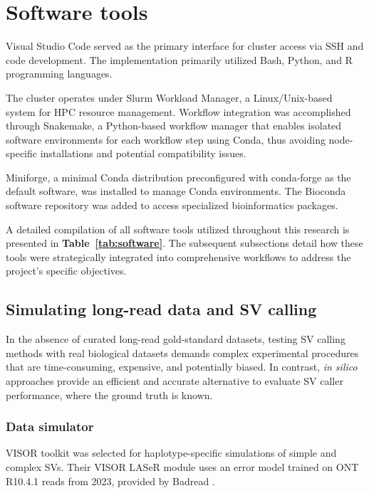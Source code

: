 \section{Software tools}

Visual Studio Code served as the primary interface for cluster access via SSH 
and code development. The implementation primarily utilized Bash, Python, and R 
programming languages.

The cluster operates under Slurm Workload Manager, a Linux/Unix-based system for 
HPC resource management. Workflow integration was accomplished through 
Snakemake, a Python-based workflow manager that enables isolated software 
environments for each workflow step using Conda, thus avoiding node-specific 
installations and potential compatibility issues.

Miniforge, a minimal Conda distribution preconfigured with conda-forge as the 
default software, was installed to manage Conda environments. The Bioconda 
software repository was added to access specialized bioinformatics packages.

A detailed compilation of all software tools utilized throughout this research
is presented in \textbf{Table~\ref{tab:software}}. The subsequent subsections 
detail how these tools were strategically integrated into comprehensive 
workflows to address the project's specific objectives.

\subsection{Simulating long-read data and SV calling}

In the absence of curated long-read gold-standard datasets, testing SV calling methods 
with real biological datasets demands complex experimental procedures that are 
time-consuming, expensive, and potentially biased. In contrast, \textit{in silico} 
approaches provide an efficient and accurate alternative to evaluate SV caller 
performance, where the ground truth is known.

\subsubsection{Data simulator}

VISOR toolkit was selected for haplotype-specific simulations of simple and 
complex SVs. Their VISOR LASeR module uses an error model trained on ONT R10.4.1 
reads from 2023, provided by Badread \cite{wick_badread_2019}.

